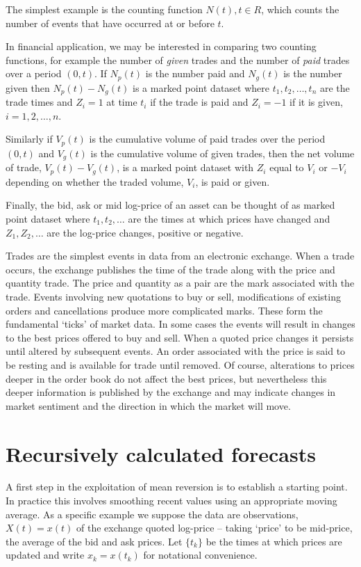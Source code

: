 The simplest example is the counting function $N(t), t \in R$,  which counts the number of events that have occurred at or before $t$.

In financial application, we may be interested in comparing two counting functions, for example the number of {\em given} trades and the number of {\em paid} trades over a period $(0,t)$. If $N_p(t)$ is the number paid and $N_g(t)$ is the number given then $N_p(t) - N_g(t)$ is a marked point dataset where $t_1,t_2,\dots,t_n$ are the trade times and $Z_i = 1$ at time $t_i$ if the trade is paid and $Z_i = -1$ if it is given, $i=1,2,\dots,n$.  

Similarly if  $V_p(t)$ is the cumulative volume of paid trades over the period $(0,t)$ and $V_g(t)$ is the cumulative volume of given trades, then the net volume of trade, $V_p(t) - V_g(t)$, is a marked point dataset with $Z_i$ equal to $V_i$ or $-V_i$ depending on whether the traded volume, $V_i$, is paid or given.

Finally, the bid, ask or mid log-price of an asset can be thought of as marked point dataset where $t_1,t_2,\dots $ are the times at which prices have changed and $Z_1,Z_2,\dots$ are the log-price changes, positive or negative.

Trades are the simplest events in data from an electronic exchange. When a trade occurs, the exchange publishes the time of the trade along with the price and quantity trade. The price and quantity as a pair are the mark associated with the trade.  Events involving new quotations to buy or sell, modifications of existing orders and cancellations produce more complicated marks.  These form the fundamental `ticks' of market data. In some cases the events will result in changes to the best prices offered to buy and sell.  When a quoted price changes it persists until altered by subsequent events. An order associated with the price is said to be resting and is available for trade until removed. Of course, alterations to prices deeper in the order book do not affect the best prices, but nevertheless this deeper information is published by the exchange and may indicate changes in market sentiment and the direction in which the market will move.  

\section{Recursively calculated forecasts}\label{sec:fastTradingAlgo}
A first step in the exploitation of mean reversion is to establish a starting point. In practice this involves smoothing recent values using an appropriate moving average. As a specific example we suppose the data are observations, $X(t) = x(t)$ of the exchange quoted log-price -- taking `price' to be mid-price, the average of the bid and ask prices. Let $\{t_k\}$ be the times  at which prices are updated and write $x_k = x(t_k)$ for notational convenience.

